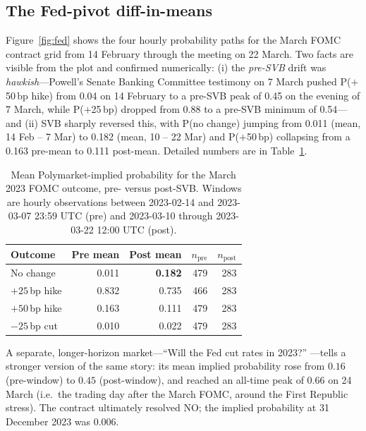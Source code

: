 \documentclass{article}
\begin{document}
\subsection{The Fed-pivot diff-in-means}
\label{sec:fed}

Figure~\ref{fig:fed} shows the four hourly probability paths for the
March FOMC contract grid from 14 February through the meeting on 22
March.  Two facts are visible from the plot and confirmed numerically:
(i) the \emph{pre-SVB} drift was \emph{hawkish}---Powell's Senate Banking
Committee testimony on 7 March pushed P($+$50\,bp hike) from 0.04 on 14
February to a pre-SVB peak of 0.45 on the evening of 7 March, while
P($+$25\,bp) dropped from 0.88 to a pre-SVB minimum of 0.54---and (ii)
SVB sharply reversed this, with P(no change) jumping
from 0.011 (mean, 14 Feb -- 7 Mar) to 0.182 (mean, 10 -- 22 Mar) and
P($+$50\,bp) collapsing from a 0.163 pre-mean to 0.111 post-mean.
Detailed numbers are in Table~\ref{tab:fedpivot}.

\begin{table}[tb]
  \centering\small
  \caption{Mean Polymarket-implied probability for the March 2023 FOMC
    outcome, pre- versus post-SVB.  Windows are hourly observations
    between 2023-02-14 and 2023-03-07 23:59 UTC (pre) and 2023-03-10
    through 2023-03-22 12:00 UTC (post).}
  \label{tab:fedpivot}
  \begin{tabular}{lrrrr}
    \toprule
    Outcome           & Pre mean & Post mean & $n_{\text{pre}}$ & $n_{\text{post}}$ \\
    \midrule
    No change         & 0.011 & \textbf{0.182} & 479 & 283 \\
    $+25$\,bp hike    & 0.832 & 0.735          & 466 & 283 \\
    $+50$\,bp hike    & 0.163 & 0.111          & 479 & 283 \\
    $-25$\,bp cut     & 0.010 & 0.022          & 479 & 283 \\
    \bottomrule
  \end{tabular}
\end{table}

A separate, longer-horizon market---``Will the Fed cut rates in 2023?''
---tells a stronger version of the same story: its mean implied
probability rose from $0.16$ (pre-window) to $0.45$ (post-window), and
reached an all-time peak of $0.66$ on 24 March (i.e.\ the trading day
after the March FOMC, around the First Republic stress).  The contract
ultimately resolved NO; the implied probability at 31 December 2023 was
0.006.
\end{document}

